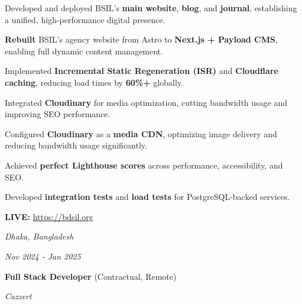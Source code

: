     \vspace{0.10 cm}
    \begin{onecolentry}
        \begin{highlights}
            \item Developed and deployed BSIL's \textbf{main website}, \textbf{blog}, and \textbf{journal}, establishing a unified, high-performance digital presence.
            \item \textbf{Rebuilt} BSIL's agency website from Astro to \textbf{Next.js + Payload CMS}, enabling full dynamic content management.
            \item Implemented \textbf{Incremental Static Regeneration (ISR)} and \textbf{Cloudflare caching}, reducing load times by \textbf{60\%+} globally.
            \item Integrated \textbf{Cloudinary} for media optimization, cutting bandwidth usage and improving SEO performance.
            \item Configured \textbf{Cloudinary} as a \textbf{media CDN}, optimizing image delivery and reducing bandwidth usage significantly.
            \item Achieved \textbf{perfect Lighthouse scores} across performance, accessibility, and SEO.
            \item Developed \textbf{integration tests} and \textbf{load tests} for PostgreSQL-backed services.
            \item \textbf{LIVE:} \url{https://bdsil.org}
        \end{highlights}
    \end{onecolentry}


    \vspace{0.2 cm}

    \begin{twocolentry}{
    \textit{Dhaka, Bangladesh}
        
    \textit{Nov 2024 - Jan 2025}}
        \textbf{Full Stack Developer} (Contractual, Remote)
        
        \textit{Cazzert}
    \end{twocolentry}

